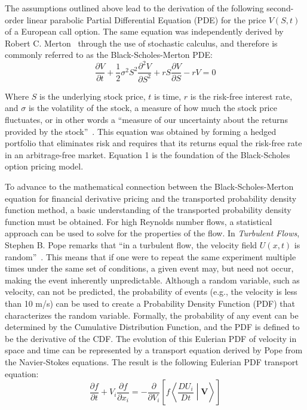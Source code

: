 \documentclass[12pt, onecolumn, journal]{IEEEtran}
\begin{document}
The assumptions outlined above lead to the derivation of the following second-order linear parabolic Partial Differential Equation (PDE) for the price $V(S,t)$ of a European call option. The same equation was independently derived by Robert C. Merton~\cite{Merton1973} through the use of stochastic calculus, and therefore is commonly referred to as the Black-Scholes-Merton PDE:
\begin{equation}
\frac{\partial V}{\partial t} + \frac{1}{2} \sigma^2 S^2 \frac{\partial^2 V}{\partial S^2} + rS \frac{\partial V}{\partial S} - rV = 0
\end{equation}

\noindent Where $S$ is the underlying stock price, $t$ is time, $r$ is the risk-free interest rate, and $\sigma$ is the volatility of the stock, a measure of how much the stock price fluctuates, or in other words a “measure of our uncertainty about the returns provided by the stock”~\cite{Hull2022}. This equation was obtained by forming a hedged portfolio that eliminates risk and requires that its returns equal the risk-free rate in an arbitrage-free market. Equation 1 is the foundation of the Black-Scholes option pricing model. 

To advance to the mathematical connection between the Black-Scholes-Merton equation for financial derivative pricing and the transported probability density function method, a basic understanding of the transported probability density function must be obtained. For high Reynolds number flows, a statistical approach can be used to solve for the properties of the flow. In \textit{Turbulent Flows}, Stephen B. Pope remarks that “in a turbulent flow, the velocity field $U(x,t)$ is random”~\cite{Pope2000}. This means that if one were to repeat the same experiment multiple times under the same set of conditions, a given event may, but need not occur, making the event inherently unpredictable. Although a random variable, such as velocity, can not be predicted, the probability of events (e.g., the velocity is less than 10 m/s) can be used to create a Probability Density Function (PDF) that characterizes the random variable. Formally, the probability of any event can be determined by the Cumulative Distribution Function, and the PDF is defined to be the derivative of the CDF. The evolution of this Eulerian PDF of velocity in space and time can be represented by a transport equation derived by Pope from the Navier-Stokes equations. The result is the following Eulerian PDF transport equation:
\begin{equation}
\frac{\partial f}{\partial t} + V_i \frac{\partial f}{\partial x_i} = - \frac{\partial}{\partial V_i} \left[f \left \langle \frac{DU_i}{Dt} \middle| \mathbf{V} \right \rangle \right]
\end{equation}
\end{document}
